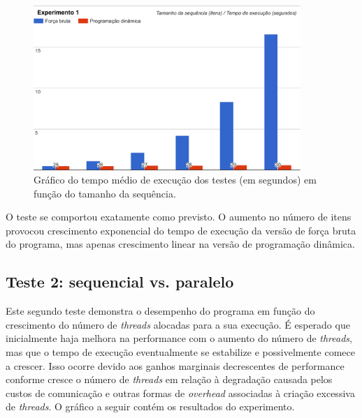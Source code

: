 \documentclass[10pt,a4paper]{article}
\numberwithin{equation}{section}
\begin{document}
\begin{figure}[H]
\begin{mdframed}
    \centering
    \includegraphics[width=0.90\textwidth]{graphics/exp1_bf.pdf}
    \caption{Gráfico do tempo médio de execução dos testes (em segundos) em função do tamanho da sequência.}
    \label{fig:experimento1}
\end{mdframed}
\end{figure}

O teste se comportou exatamente como previsto. O aumento no número de itens provocou crescimento exponencial do tempo de execução da versão de força bruta do programa, mas apenas crescimento linear na versão de programação dinâmica.

\subsection{Teste 2: sequencial vs. paralelo}

Este segundo teste demonstra o desempenho do programa em função do crescimento do número de \emph{threads} alocadas para a sua execução. É esperado que inicialmente haja melhora na performance com o aumento do número de \emph{threads}, mas que o tempo de execução eventualmente se estabilize e possivelmente comece a crescer. Isso ocorre devido aos ganhos marginais decrescentes de performance conforme cresce o número de \emph{threads} em relação à degradação causada pelos custos de comunicação e outras formas de \emph{overhead} associadas à criação excessiva de \emph{threads}. O gráfico a seguir contém os resultados do experimento.
\end{document}
